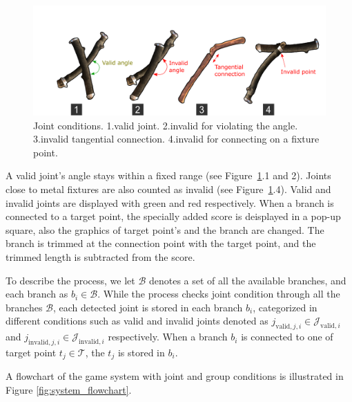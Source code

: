 \begin{figure}[ht]
	\begin{center}
		\includegraphics[width = 0.4\paperwidth]{images/system/joint_conditions_2.png}
		\caption{Joint conditions. 1.valid joint. 2.invalid for violating the angle. 3.invalid tangential connection. 4.invalid for connecting on a fixture point. }
		\label{fig:joint_condition}
	\end{center}
\end{figure}


A valid joint's angle stays within a fixed range (see Figure~\ref{fig:joint_condition}.1 and 2). 
Joints close to metal fixtures are also counted as invalid (see Figure~\ref{fig:joint_condition}.4).
Valid and invalid joints are displayed with green and red respectively.
When a branch is connected to a target point, the specially added score is deisplayed in a pop-up square, also the graphics of target point's and the branch are changed.
The branch is trimmed at the connection point with the target point, and the trimmed length is subtracted from the score.

To describe the process, we let $\mathcal{B}$ denotes a set of all the available branches, and each branch as $ b_i \in \mathcal{B}$.
While the process checks joint condition through all the branches $\mathcal{B}$, each detected joint is stored in each branch $b_i$, categorized in different conditions such as valid and invalid joints denoted as $j_{\text{valid}, j, i} \in \mathcal{J}_{\text{valid},i}$ and $j_{\text{invalid}, j, i} \in \mathcal{J}_{\text{invalid},i}$ respectively.
When a branch $b_i$ is connected to one of target point $t_j \in \mathcal{T} $, the $t_j$ is stored in $b_i$.


A flowchart of the game system with joint and group conditions is illustrated in Figure \ref{fig:system_flowchart}.

